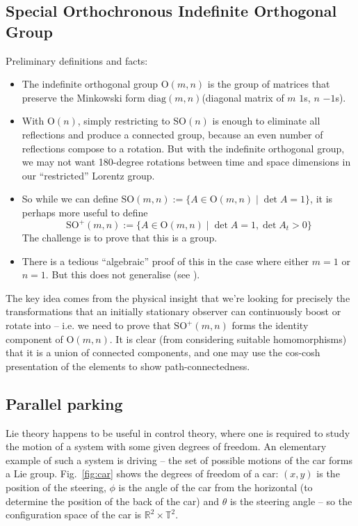\documentclass{article}
\newcommand{\diag}{\mathrm{diag}}
\newcommand{\Tor}{\mathbb{T}}
\newcommand{\Real}{\mathbb{R}}
\newcommand{\gSO}{\mathrm{SO}}
\newcommand{\gO}{\mathrm{O}}
\begin{document}
\subsection{Special Orthochronous Indefinite Orthogonal Group}
Preliminary definitions and facts:
\begin{itemize}
    \item The indefinite orthogonal group $\gO(m,n)$ is the group of matrices that preserve the Minkowski form $\diag(m, n)$(diagonal matrix of $m$ $1$s, $n$ $-1$s).
    \item With $\gO(n)$, simply restricting to $\gSO(n)$ is enough to eliminate all reflections and produce a connected group, because an even number of reflections compose to a rotation. But with the indefinite orthogonal group, we may not want 180-degree rotations between time and space dimensions in our ``restricted'' Lorentz group.
    \item So while we can define $\gSO(m,n):=\{A\in \gO(m,n)\mid \det A = 1\}$, it is perhaps more useful to define 
    $$\gSO^+(m,n):=\{A\in \gO(m,n)\mid \det A = 1, \det A_t > 0\}$$
    The challenge is to prove that this is a group.
    \item There is a tedious ``algebraic'' proof of this in the case where either $m=1$ or $n=1$. But this does not generalise (see \cite{omn}).
\end{itemize}
The key idea comes from the physical insight that we're looking for precisely the transformations that an initially stationary observer can continuously boost or rotate into -- i.e. we need to prove that $\gSO^+(m,n)$ forms the identity component of $\gO(m,n)$. It is clear (from considering suitable homomorphisms) that it is a union of connected components, and one may use the cos-cosh presentation of the elements to show path-connectedness.

\subsection{Parallel parking}

Lie theory happens to be useful in control theory, where one is required to study the motion of a system with some given degrees of freedom. An elementary example of such a system is driving -- the set of possible motions of the car forms a Lie group. Fig.~\ref{fig:car} shows the degrees of freedom of a car: $(x,y)$ is the position of the steering, $\phi$ is the angle of the car from the horizontal (to determine the position of the back of the car) and $\theta$ is the steering angle -- so the configuration space of the car is $\Real^2\times\Tor^2$.
\end{document}
